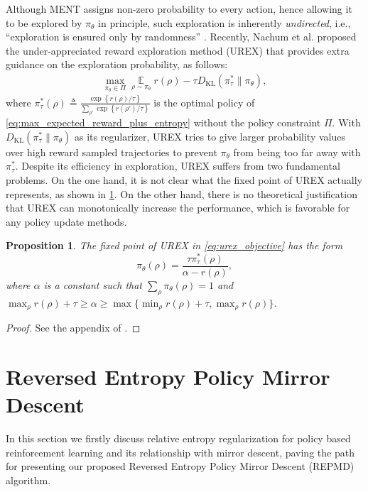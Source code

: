 \documentclass{article}
\DeclareMathOperator*\ep{\mathbb{E}}
\newcommand{\KL}{D_{\text{KL}}}
\newtheorem{prop}{Proposition}
\begin{document}
Although MENT assigns non-zero probability to every action, hence allowing it to be explored by $\pi_\theta$ in principle, such exploration is inherently \textit{undirected}, i.e., ``exploration is ensured only by randomness'' \cite{thrun1992efficient}. 
Recently, Nachum et al. \cite{nachum2017improving} proposed the under-appreciated reward exploration method (UREX) that provides extra guidance on the exploration probability, as follows:
\begin{equation}
\label{eq:urex_objective}
\begin{split}
\max\limits_{\pi_\theta \in \Pi}{ \ep\limits_{\rho \sim \pi_\theta}{  r(\rho)  - \tau \KL(\pi_\tau^* \| \pi_\theta) } },
\end{split}
\end{equation}
where $\pi_\tau^*(\rho) \triangleq \frac{\exp\left\{ r(\rho) / \tau \right\}}{ \sum_{\rho'}{ \exp\left\{ r(\rho') / \tau \right\} } }$ is the optimal policy of \cref{eq:max_expected_reward_plus_entropy} without the policy constraint $\Pi$. With $\KL(\pi_\tau^* \| \pi_\theta)$ as its regularizer, UREX tries to give larger probability values over high reward sampled trajectories to prevent $\pi_\theta$ from being too far away with $\pi_\tau^*$. Despite its efficiency in exploration, UREX suffers from two fundamental problems. On the one hand, it is not clear what the fixed point of UREX actually represents, as shown in \cref{prop:urex_fixedpoint}. On the other hand, there is no theoretical justification that UREX can monotonically increase the performance, which is favorable for any policy update methods. 
\begin{prop}
	\label{prop:urex_fixedpoint}
	The fixed point of UREX in \cref{eq:urex_objective} has the form
	\[
	\pi_\theta(\rho) = \frac{\tau \pi_\tau^*(\rho)}{\alpha - r(\rho)},
	\]
	where $\alpha$ is a constant such that $\sum_{\rho}{ \pi_\theta(\rho)} = 1$ and $ \max_{\rho}{ r(\rho) } + \tau \ge \alpha \ge  \max\{\min_{\rho}{ r(\rho) } + \tau, \max_{\rho}{ r(\rho) } \}$.
\end{prop}
\begin{proof}
See the appendix of \cite{nachum2017improving}.
\end{proof}

\section{Reversed Entropy Policy Mirror Descent}
In this section we firstly discuss relative entropy regularization for policy based reinforcement learning and its relationship with mirror descent, paving the path for presenting our proposed Reversed Entropy Policy Mirror Descent (REPMD) algorithm. 
\end{document}
